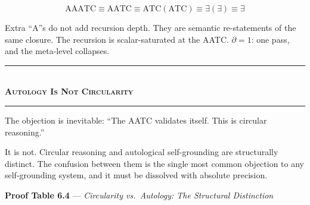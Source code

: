 \documentclass[10pt, openany, oneside]{book}
\renewcommand{\normalsize}{\fontsize{10}{13}\selectfont}
\begin{document}
$$\text{AAATC} \equiv \text{AATC} \equiv \text{ATC}(\text{ATC}) \equiv \exists(\exists) \equiv \exists$$

Extra ``A''s do not add recursion depth. They are semantic re-statements of the same closure. The recursion is scalar-saturated at the AATC. $\partial = 1$: one pass, and the meta-level collapses.

\vspace{1.5em}


\begin{center}
    \rule{0.3\textwidth}{0.4pt}\\[0.5em]
    {\normalsize\bfseries\scshape Autology Is Not Circularity}\\[0.3em]
    \rule{0.3\textwidth}{0.4pt}
\end{center}

\vspace{1em}

\noindent The objection is inevitable: ``The AATC validates itself. This is circular reasoning.''

It is not. Circular reasoning and autological self-grounding are structurally distinct. The confusion between them is the single most common objection to any self-grounding system, and it must be dissolved with absolute precision.

\textbf{Proof Table 6.4} --- \textit{Circularity vs.\ Autology: The Structural Distinction}

\vspace{0.5em}
\end{document}
